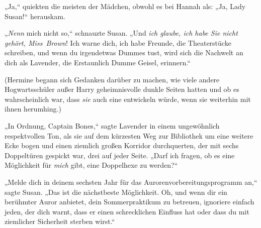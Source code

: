 „Ja,“ quiekten die meisten der Mädchen, obwohl es bei Hannah als: „Ja, Lady Susan!“ herauskam.

„\emph{Nenn} mich nicht so,“ schnauzte Susan. „Und \emph{ich glaube, ich habe Sie nicht} \emph{gehört, Miss~Brown}! Ich warne dich, ich habe Freunde, die Theaterstücke schreiben, und wenn du irgendetwas Dummes tust, wird sich die Nachwelt an dich als Lavender, die Erstaunlich Dumme Geisel, erinnern.“

(Hermine begann sich Gedanken darüber zu machen, wie viele andere Hogwartsschüler außer Harry geheimnisvolle dunkle Seiten hatten und ob es wahrscheinlich war, dass \emph{sie} auch eine entwickeln würde, wenn sie weiterhin mit ihnen herumhing.)

„In Ordnung, Captain Bones,“ sagte Lavender in einem ungewöhnlich respektvollen Ton, als sie auf dem kürzesten Weg zur Bibliothek um eine weitere Ecke bogen und einen ziemlich großen Korridor durchquerten, der mit sechs Doppeltüren gespickt war, drei auf jeder Seite. „Darf ich fragen, ob es eine Möglichkeit für \emph{mich} gibt, eine Doppelhexe zu werden?“

„Melde dich in deinem sechsten Jahr für das Aurorenvorbereitungsprogramm an,“ sagte Susan. „Das ist die nächstbeste Möglichkeit. Oh, und wenn dir ein berühmter Auror anbietet, dein Sommerpraktikum zu betreuen, ignoriere einfach jeden, der dich warnt, dass er einen schrecklichen Einfluss hat oder dass du mit ziemlicher Sicherheit sterben wirst.“

